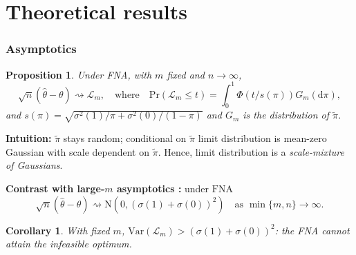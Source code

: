 \documentclass[aspectratio=169, 10pt]{beamer}
\theoremstyle{definition}
\theoremstyle{plain}
\newtheorem*{cor*}{Corollary}
\newtheorem*{prop*}{Proposition}
\def\Pr{\mathrm{Pr}}
\def\Var{\mathrm{Var}}
\def\dto{\rightsquigarrow}
\def\Normal{\mathrm{N}} %
\def\FNA{\mathrm{FNA}}
\begin{document}
\section{Theoretical results}

\begin{frame}
\frametitle{Asymptotics}
\begin{prop*}
Under FNA, with \(m\) fixed and \(n \to \infty\),
\begin{equation*}
  \sqrt{n} (\hat{\theta} - \theta)
  \dto \mathcal{L}_{m}, \quad \text{where} \quad
  \Pr(\mathcal{L}_m \le t) = \int_{0}^{1} \Phi \left( t / s (\pi) \right)
  G_{m} (\mathrm{d} \pi),
\end{equation*}
and \(s (\pi) = \sqrt{\sigma^{2} (1) / \pi + \sigma^{2} (0) / (1 - \pi)}\) and
\(G_{m}\) is the distribution of \(\tilde{\pi}\).
\end{prop*}
\vfill
\textbf{Intuition:} \(\tilde{\pi}\) stays random; conditional on \(\tilde{\pi}\)
limit distribution is mean-zero Gaussian with scale dependent on
\(\tilde{\pi}\).
Hence, limit distribution is a \emph{scale-mixture of Gaussians}.
\vfill

\pause

\textbf{Contrast with large-\(m\) asymptotics
\citep{2011hahnAdaptiveExperimentalDesign}:} under \(\FNA\)
\begin{equation*}
  \sqrt{n} (\hat{\theta} - \theta) \dto \Normal \left(0, (\sigma (1) + \sigma
  (0))^{2} \right) \quad \text{as } \min \{m, n\} \to \infty.
\end{equation*}

\pause
\begin{cor*}
With fixed \(m\), \(\Var (\mathcal{L}_{m}) > (\sigma (1) + \sigma (0))^{2}\):
the FNA cannot attain the infeasible optimum.
\end{cor*}
\end{frame}
\end{document}
